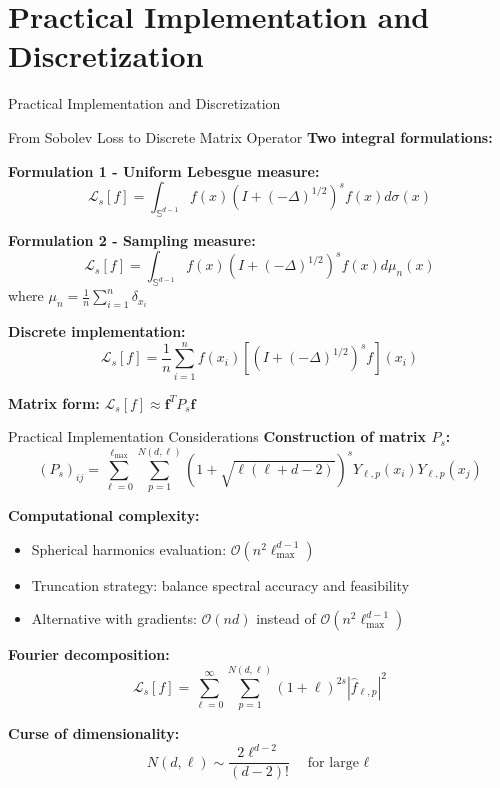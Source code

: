\documentclass{beamer}
\begin{document}
\section{Practical Implementation and Discretization}

\begin{frame}
\begin{center}
\huge{Practical Implementation and Discretization}
\end{center}
\end{frame}

\begin{frame}{From Sobolev Loss to Discrete Matrix Operator}
\textbf{Two integral formulations:}

\textbf{Formulation 1 - Uniform Lebesgue measure:}
\[ \mathcal{L}_s[f] = \int_{\mathbb{S}^{d-1}} f(x) (I + (-\Delta)^{1/2})^s f(x) d\sigma(x) \]

\textbf{Formulation 2 - Sampling measure:}
\[ \mathcal{L}_s[f] = \int_{\mathbb{S}^{d-1}} f(x) (I + (-\Delta)^{1/2})^s f(x) d\mu_n(x) \]
where $\mu_n = \frac{1}{n}\sum_{i=1}^n \delta_{x_i}$

\textbf{Discrete implementation:}
\[ \mathcal{L}_s[f] = \frac{1}{n}\sum_{i=1}^n f(x_i) \left[(I + (-\Delta)^{1/2})^s f\right](x_i) \]

\textbf{Matrix form:} $\mathcal{L}_s[f] \approx \mathbf{f}^T P_s \mathbf{f}$
\end{frame}

\begin{frame}{Practical Implementation Considerations}
\textbf{Construction of matrix $P_s$:}
\[ (P_s)_{ij} = \sum_{\ell=0}^{\ell_{\max}} \sum_{p=1}^{N(d,\ell)} (1 + \sqrt{\ell(\ell + d - 2)})^s Y_{\ell,p}(x_i) Y_{\ell,p}(x_j) \]

\textbf{Computational complexity:}
\begin{itemize}
\item Spherical harmonics evaluation: $\mathcal{O}(n^2 \ell_{\max}^{d-1})$
\item Truncation strategy: balance spectral accuracy and feasibility
\item Alternative with gradients: $\mathcal{O}(nd)$ instead of $\mathcal{O}(n^2\ell_{\max}^{d-1})$
\end{itemize}

\textbf{Fourier decomposition:}
\[ \mathcal{L}_s[f] = \sum_{\ell=0}^{\infty} \sum_{p=1}^{N(d,\ell)} (1+\ell)^{2s} |\hat{f}_{\ell,p}|^2 \]

\textbf{Curse of dimensionality:}
\[ N(d,\ell) \sim \frac{2\ell^{d-2}}{(d-2)!} \quad \text{for large $\ell$} \]
\end{frame}
\end{document}
